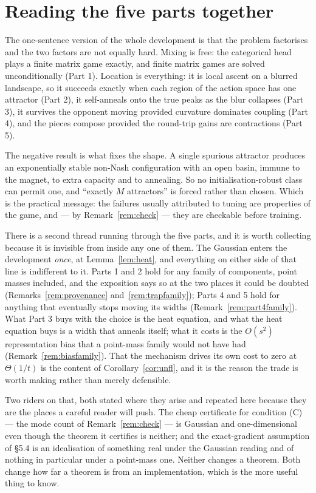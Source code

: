 \documentclass[11pt]{article}
\theoremstyle{definition}
\begin{document}
\section*{Reading the five parts together}

The one-sentence version of the whole development is that the problem factorises
and the two factors are not equally hard. Mixing is free: the categorical head
plays a finite matrix game exactly, and finite matrix games are solved
unconditionally (Part 1). Location is everything: it is local ascent on a blurred
landscape, so it succeeds exactly when each region of the action space has one
attractor (Part 2), it self-anneals onto the true peaks as the blur collapses
(Part 3), it survives the opponent moving provided curvature dominates coupling
(Part 4), and the pieces compose provided the round-trip gains are contractions
(Part 5).

The negative result is what fixes the shape. A single spurious attractor produces
an exponentially stable non-Nash configuration with an open basin, immune to the
magnet, to extra capacity and to annealing. So no initialisation-robust class can
permit one, and ``exactly $M$ attractors'' is forced rather than chosen. Which is
the practical message: the failures usually attributed to tuning are properties of
the game, and --- by Remark~\ref{rem:check} --- they are checkable before training.

There is a second thread running through the five parts, and it is worth
collecting because it is invisible from inside any one of them. The Gaussian
enters the development \emph{once}, at Lemma~\ref{lem:heat}, and everything on
either side of that line is indifferent to it. Parts 1 and 2 hold for any family
of components, point masses included, and the exposition says so at the two places
it could be doubted (Remarks~\ref{rem:provenance} and~\ref{rem:trapfamily}); Parts
4 and 5 hold for anything that eventually stops moving its widths
(Remark~\ref{rem:part4family}). What Part 3 buys with the choice is the heat
equation, and what the heat equation buys is a width that anneals itself; what it
costs is the $O(s^2)$ representation bias that a point-mass family would not have
had (Remark~\ref{rem:biasfamily}). That the mechanism drives its own cost to zero
at $\Theta(1/t)$ is the content of Corollary~\ref{cor:unfl}, and it is the reason
the trade is worth making rather than merely defensible.

Two riders on that, both stated where they arise and repeated here because they
are the places a careful reader will push. The cheap certificate for condition (C)
--- the mode count of Remark~\ref{rem:check} --- is Gaussian and one-dimensional
even though the theorem it certifies is neither; and the exact-gradient assumption
of \S5.4 is an idealisation of something real under the Gaussian reading and of
nothing in particular under a point-mass one. Neither changes a theorem. Both
change how far a theorem is from an implementation, which is the more useful thing
to know.
\end{document}
